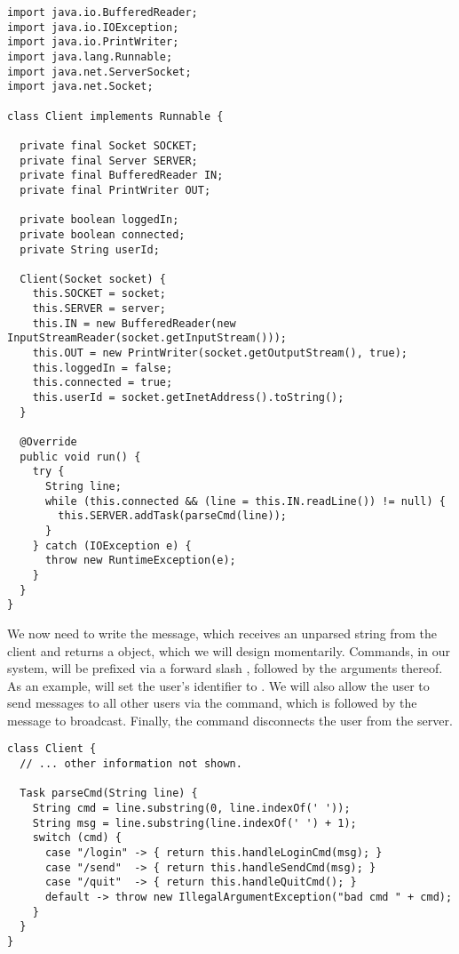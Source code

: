 \begin{lstlisting}[language=MyJava]
import java.io.BufferedReader;
import java.io.IOException;
import java.io.PrintWriter;
import java.lang.Runnable;
import java.net.ServerSocket;
import java.net.Socket;

class Client implements Runnable {

  private final Socket SOCKET;
  private final Server SERVER;
  private final BufferedReader IN;
  private final PrintWriter OUT;

  private boolean loggedIn;
  private boolean connected;
  private String userId;

  Client(Socket socket) {
    this.SOCKET = socket;
    this.SERVER = server;
    this.IN = new BufferedReader(new InputStreamReader(socket.getInputStream()));
    this.OUT = new PrintWriter(socket.getOutputStream(), true);
    this.loggedIn = false;
    this.connected = true;
    this.userId = socket.getInetAddress().toString();
  }

  @Override
  public void run() {
    try {
      String line;
      while (this.connected && (line = this.IN.readLine()) != null) { 
        this.SERVER.addTask(parseCmd(line)); 
      }
    } catch (IOException e) { 
      throw new RuntimeException(e);
    }
  }
}
\end{lstlisting}

We now need to write the  message, which receives an unparsed string from the client and returns a  object, which we will design momentarily. 
Commands, in our system, will be prefixed via a forward slash \ttt{/}, followed by the arguments thereof. 
As an example,  will set the user's identifier to . 
We will also allow the user to send messages to all other users via the  command, which is followed by the message to broadcast. 
Finally, the  command disconnects the user from the server.

\newpage
\begin{lstlisting}[language=MyJava]
class Client {
  // ... other information not shown.

  Task parseCmd(String line) {
    String cmd = line.substring(0, line.indexOf(' '));
    String msg = line.substring(line.indexOf(' ') + 1);
    switch (cmd) {
      case "/login" -> { return this.handleLoginCmd(msg); }
      case "/send"  -> { return this.handleSendCmd(msg); }
      case "/quit"  -> { return this.handleQuitCmd(); }
      default -> throw new IllegalArgumentException("bad cmd " + cmd);
    }
  }
}
\end{lstlisting}

